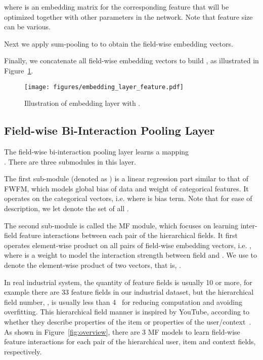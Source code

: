 \documentclass[sigconf]{acmart}
\begin{document}
where  is an embedding matrix for the corresponding feature that will be optimized together with other parameters in the network. Note that feature size can be various. 

Next we apply sum-pooling to  to obtain the field-wise embedding vectors. 


Finally, we concatenate all field-wise embedding vectors to build , as illustrated in Figure~\ref{fig:field_embedding}. 
\begin{figure}[htbp]
\centering\texttt{[image: figures/embedding\_layer\_feature.pdf]}
\caption{Illustration of embedding layer with .}
\label{fig:field_embedding}
\end{figure} 

\subsection{Field-wise Bi-Interaction Pooling Layer}\label{sec:interaction}

The field-wise bi-interaction pooling layer learns a mapping \\ . 
There are three submodules in this layer. 

The first sub-module (denoted as ) is a linear regression part similar to that of FWFM, which models global bias of data and weight of categorical features. It operates on the categorical vectors, i.e.  where  is bias term. Note that for ease of description, we let  denote the set of all .

The second sub-module is called the MF module, which focuses on learning inter-field feature interactions between each pair of the hierarchical fields. It first operates element-wise product on all pairs of field-wise embedding vectors, i.e.  , where  is a weight to model the interaction strength between field  and . We use  to denote the element-wise product of two vectors, that is, . 

In real industrial system, the quantity of feature fields is usually 10 or more, for example there are 33 feature fields in our industrial dataset, but the hierarchical field number, , is usually less than 4~\citep{liu2017pbodl,covington2016deep} for reducing computation and avoiding overfitting. This hierarchical field manner is inspired by YouTube, according to whether they describe properties of the item or properties of the user/context~\citep{covington2016deep}.
As shown in Figure~\ref{fig:overview}, there are 3 MF models to learn field-wise feature interactions for each pair of the hierarchical user, item and context fields, respectively.
\end{document}
